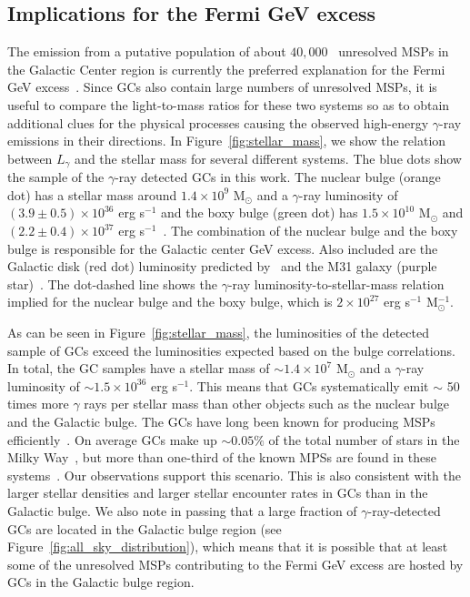 \documentclass[doublespace,nopageskip]{VTthesis} %
\begin{document}
\subsection{Implications for the Fermi GeV excess}

The emission from a putative population of about $40,000$~\citep{2020JCAP...12..035P} unresolved MSPs in the Galactic Center region is currently the preferred explanation for the Fermi GeV excess~\citep{2018NatAs...2..387M,2018NatAs...2..819B,2019JCAP...09..042M,2020PhRvD.102d3012A}. Since GCs also contain large numbers of unresolved MSPs, it is useful to compare the light-to-mass ratios for these two systems so as to obtain additional clues for the physical processes causing the observed high-energy $\gamma$-ray emissions in their directions. In Figure~\ref{fig:stellar_mass}, we show the relation between $L_\gamma$ and the stellar mass for several different systems. The blue dots show the sample of the $\gamma$-ray detected GCs in this work. The nuclear bulge (orange dot) has a stellar mass around $1.4\times 10^9$ M$_\odot$ and a $\gamma$-ray luminosity of $(3.9\pm 0.5)\times 10^{36}$ erg s$^{-1}$ and the boxy bulge (green dot) has $1.5\times 10^{10}$ M$_\odot$ and $(2.2 \pm 0.4)\times 10^{37}$ erg s$^{-1}$~\citep{2019JCAP...09..042M}. The combination of the nuclear bulge and the boxy bulge is responsible for the Galactic center GeV excess. Also included are the Galactic disk (red dot) luminosity predicted by~\citet{2018NatAs...2..819B} and the M31 galaxy (purple star)~\citep{2017ApJ...836..208A}. The dot-dashed line shows the $\gamma$-ray luminosity-to-stellar-mass relation implied for the nuclear bulge and the boxy bulge, which is $2 \times 10^{27}$ erg s$^{-1}$ M$_\odot^{-1}$. 

As can be seen in Figure~\ref{fig:stellar_mass}, the luminosities of the detected sample of GCs exceed the luminosities expected based on the bulge correlations. In total, the GC samples have a stellar mass of $\sim 1.4\times 10^7$ M$_\odot$ and a $\gamma$-ray luminosity of $\sim 1.5\times 10^{36}$ erg s$^{-1}$. This means that GCs systematically emit $\sim$ 50 times more $\gamma$ rays per stellar mass than other objects such as the nuclear bulge and the Galactic bulge. The GCs have long been known for producing MSPs efficiently~\citep{2005ASPC..328..147C}. On average GCs make up $\sim 0.05\%$ of the total number of stars in the Milky Way~\citep{2019ApJ...877..122Y}, but more than one-third of the known MPSs are found in these systems~\citep{2005AJ....129.1993M}. Our observations support this scenario. This is also consistent with the larger stellar densities and larger stellar encounter rates in GCs than in the Galactic bulge. We also note in passing that a large fraction of $\gamma$-ray-detected GCs are located in the Galactic bulge region (see Figure~\ref{fig:all_sky_distribution}), which means that it is possible that at least some of the unresolved MSPs contributing to the Fermi GeV excess are hosted by GCs in the Galactic bulge region.
\end{document}
